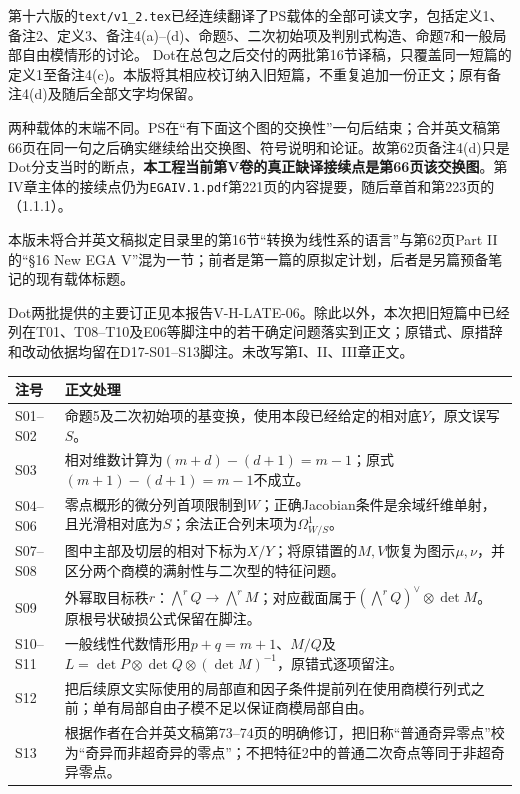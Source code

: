 
第十六版的\texttt{text/v1\_2.tex}已经连续翻译了PS载体的全部可读文字，包括定义1、备注2、定义3、备注4(a)--(d)、命题5、二次初始项及判别式构造、命题7和一般局部自由模情形的讨论。
Dot在总包之后交付的两批第16节译稿，只覆盖同一短篇的定义1至备注4(c)。本版将其相应校订纳入旧短篇，不重复追加一份正文；原有备注4(d)及随后全部文字均保留。

两种载体的末端不同。PS在“有下面这个图的交换性”一句后结束；合并英文稿第66页在同一句之后确实继续给出交换图、符号说明和论证。故第62页备注4(d)只是Dot分支当时的断点，\textbf{本工程当前第V卷的真正缺译接续点是第66页该交换图}。第IV章主体的接续点仍为\texttt{EGAIV.1.pdf}第221页的内容提要，随后章首和第223页的（1.1.1）。

本版未将合并英文稿拟定目录里的第16节“转换为线性系的语言”与第62页Part II的“§16 New EGA V”混为一节；前者是第一篇的原拟定计划，后者是另篇预备笔记的现有载体标题。

Dot两批提供的主要订正见本报告V-H-LATE-06。除此以外，本次把旧短篇中已经列在T01、T08--T10及E06等脚注中的若干确定问题落实到正文；原错式、原措辞和改动依据均留在D17-S01--S13脚注。未改写第I、II、III章正文。

\begin{longtable}{@{}p{.16\linewidth}p{.76\linewidth}@{}}
\toprule 注号 & 正文处理\\\midrule\endhead
S01--S02 & 命题5及二次初始项的基变换，使用本段已经给定的相对底$Y$，原文误写$S$。\\
S03 & 相对维数计算为$(m+d)-(d+1)=m-1$；原式$(m+1)-(d+1)=m-1$不成立。\\
S04--S06 & 零点概形的微分列首项限制到$W$；正确Jacobian条件是余域纤维单射，且光滑相对底为$S$；余法正合列末项为$\Omega^1_{W/S}$。\\
S07--S08 & 图中主部及切层的相对下标为$X/Y$；将原错置的$M,V$恢复为图示$\mu,\nu$，并区分两个商模的满射性与二次型的特征问题。\\
S09 & 外幂取目标秩$r$：$\bigwedge^rQ\to\bigwedge^rM$；对应截面属于$(\bigwedge^rQ)^\vee\otimes\det M$。原根号状破损公式保留在脚注。\\
S10--S11 & 一般线性代数情形用$p+q=m+1$、$M/Q$及$L=\det P\otimes\det Q\otimes(\det M)^{-1}$，原错式逐项留注。\\
S12 & 把后续原文实际使用的局部直和因子条件提前列在使用商模行列式之前；单有局部自由子模不足以保证商模局部自由。\\
S13 & 根据作者在合并英文稿第73--74页的明确修订，把旧称“普通奇异零点”校为“奇异而非超奇异的零点”；不把特征2中的普通二次奇点等同于非超奇异零点。\\
\bottomrule
\end{longtable}

